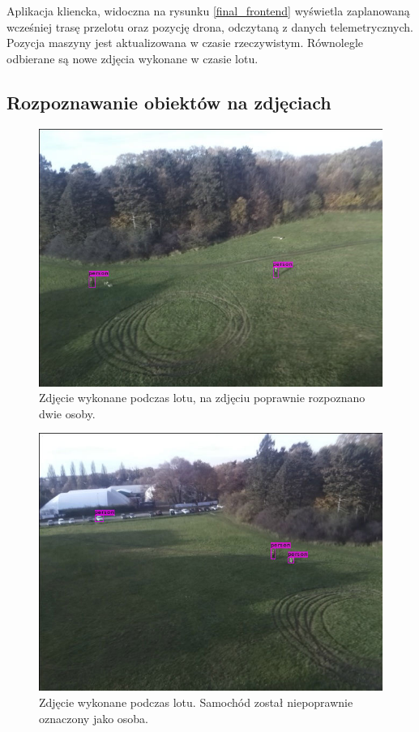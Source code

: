 Aplikacja kliencka, widoczna na rysunku \ref{final_frontend} wyświetla zaplanowaną
wcześniej trasę przelotu oraz pozycję drona, odczytaną z danych telemetrycznych.
Pozycja maszyny jest aktualizowana w czasie rzeczywistym. Równolegle odbierane
są nowe zdjęcia wykonane w czasie lotu.

\subsection{Rozpoznawanie obiektów na zdjęciach}
\begin{multicols}{2}
    
\begin{figure}[H]
	\centering
	\includegraphics[width=\linewidth]{rys05/correctly_recognised_2_ppl.jpg}
    \caption{
        Zdjęcie wykonane podczas lotu, na zdjęciu poprawnie rozpoznano dwie osoby.
    }
	\label{final_ai_good}
\end{figure}

\begin{figure}[H]
	\centering
	\includegraphics[width=\linewidth]{rys05/car_person.jpg}
    \caption{
        Zdjęcie wykonane podczas lotu. Samochód został niepoprawnie oznaczony jako osoba.
    }
	\label{final_ai_bad}
\end{figure}
\end{multicols}

